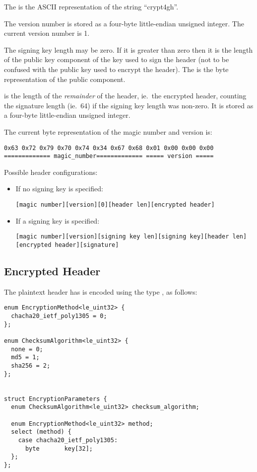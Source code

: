 The  is the ASCII representation of the string ``crypt4gh''.

The version number is stored as a four-byte little-endian unsigned integer.
%
The current version number is 1.

The signing key length may be zero.
%
If it is greater than zero then it is the length of the public key
component of the key used to sign the header (not to be confused with
the public key used to encrypt the header).
%
The  is the byte representation of the public
component.

 is the length of the \emph{remainder} of the header,
ie.\ the encrypted header, counting the signature length (ie.\ 64) if
the signing key length was non-zero.
%
It is stored as a four-byte little-endian unsigned integer.

The current byte representation of the magic number and version is:
\begin{verbatim}
0x63 0x72 0x79 0x70 0x74 0x34 0x67 0x68 0x01 0x00 0x00 0x00
============= magic_number============= ===== version =====
\end{verbatim}

Possible header configurations:
%
\begin{itemize}
%
\item If no signing key is specified:
\begin{verbatim}
[magic number][version][0][header len][encrypted header]
\end{verbatim}
%
\item If a signing key is specified:
\begin{verbatim}
[magic number][version][signing key len][signing key][header len][encrypted header][signature]
\end{verbatim}
%
\end{itemize}


\subsection{Encrypted Header}\label{encrypted:header}
%

The plaintext header has is encoded using the type
, as follows:

\begin{verbatim}
enum EncryptionMethod<le_uint32> {
  chacha20_ietf_poly1305 = 0;
};

enum ChecksumAlgorithm<le_uint32> {
  none = 0;
  md5 = 1;
  sha256 = 2;
};


struct EncryptionParameters {
  enum ChecksumAlgorithm<le_uint32> checksum_algorithm;

  enum EncryptionMethod<le_uint32> method;
  select (method) {
    case chacha20_ietf_poly1305:
      byte       key[32];
  };
};
\end{verbatim}

